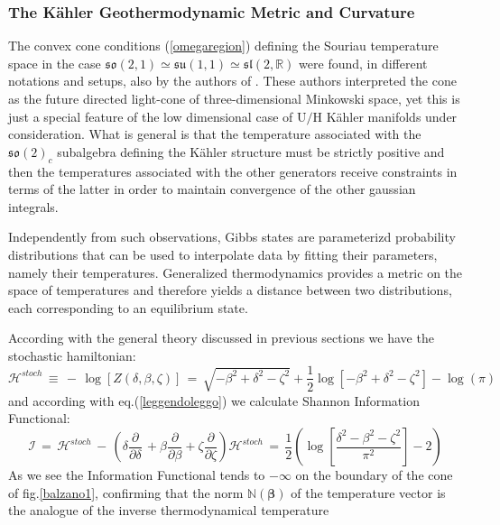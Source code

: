 \documentclass[10pt,a4paper]{article}
\newcommand{\so}{\mathfrak{so}}
\newcommand{\su}{\mathfrak{su}}
\newcommand{\slal}{\mathfrak{sl}}
\begin{document}
\subsubsection{The K\"ahler Geothermodynamic Metric and Curvature}
The convex cone conditions (\ref{omegaregion}) defining the Souriau temperature space in the case
$\so(2,1)\simeq \su(1,1)\simeq\slal(2,\mathbb{R})$ were found, in different notations and setups, also by the authors of \cite{marlentropia,caldobarbaresco,barbaresco2,barbaresco3,marlegibbs}. These authors interpreted the cone as the future directed light-cone of three-dimensional Minkowski space, yet this is just a special feature of the low dimensional case of $\mathrm{U/H}$ K\"ahler manifolds  under consideration. What is general is that the temperature associated with the $\so(2)_c$ subalgebra defining the K\"ahler structure must be strictly positive and then the temperatures associated with the other generators receive constraints in terms of the latter in order to maintain convergence of the other gaussian integrals.
\par
Independently from such observations, Gibbs states are parameterizd probability distributions that can be used to interpolate data by fitting their parameters, namely their temperatures.  Generalized thermodynamics provides a metric on the space of temperatures and therefore yields a distance between two distributions, each corresponding to an equilibrium state.
\par
According with the general theory discussed in previous sections we have the stochastic hamiltonian:
\begin{equation}\label{cartolina}
  \mathcal{H}^{stoch} \, \equiv \, - \, \log\left[Z(\delta,\beta,\zeta)\right] \, = \, \sqrt{-\beta ^2+\delta ^2-\zeta ^2}+\frac{1}{2} \log \left[-\beta ^2+\delta ^2-\zeta
   ^2\right]-\log (\pi )
\end{equation}
and according with eq.(\ref{leggendoleggo}) we calculate  Shannon Information Functional:
\begin{equation}\label{cruciverba}
  \mathcal{I}\, = \, \mathcal{H}^{stoch} \, - \,\left(\delta \frac{\partial}{\partial\delta}\,+ \beta \frac{\partial}{\partial\beta} + \zeta\frac{\partial}{\partial\zeta}\right)\mathcal{H}^{stoch} \, = \, \frac{1}{2} \left(\log \left[\frac{\delta ^2-\beta ^2-\zeta ^2}{\pi^2}\right]-2\right)
\end{equation}
As we see the Information Functional tends to $-\infty$ on the boundary of the cone of fig.\ref{balzano1}, confirming that the norm  $\mathbb{N}(\boldsymbol{\beta})$ of the temperature vector is the analogue of the inverse thermodynamical temperature
\end{document}
